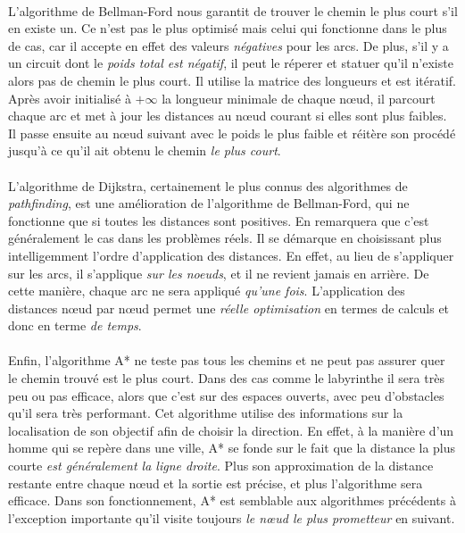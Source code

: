 \paragraph{} L'algorithme de Bellman-Ford nous garantit de trouver le chemin le plus court s'il en existe un. Ce n'est pas
le plus optimisé mais celui qui fonctionne dans le plus de cas, car il accepte en effet des valeurs \emph{négatives} pour les
arcs. De plus, s'il y a un circuit dont le \emph{poids total est négatif}, il peut le réperer et statuer qu'il n'existe alors
pas de chemin le plus court. Il utilise la matrice des longueurs et est itératif. Après avoir initialisé à $+\infty$ la 
longueur minimale de chaque n\oe{}ud, il parcourt chaque arc et met à jour les distances au n\oe{}ud courant si elles sont
plus faibles. Il passe ensuite au n\oe{}ud suivant avec le poids le plus faible et réitère son procédé jusqu'à ce qu'il ait
obtenu le chemin \emph{le plus court}.

\paragraph{} L'algorithme de Dijkstra, certainement le plus connus des algorithmes de \emph{pathfinding}, est une amélioration
de l'algorithme de Bellman-Ford, qui ne fonctionne que si toutes les distances sont positives. En remarquera que c'est généralement
le cas dans les problèmes réels. Il se démarque en choisissant plus intelligemment l'ordre d'application des distances. En effet,
au lieu de s'appliquer sur les arcs, il s'applique \emph{sur les noeuds}, et il ne revient jamais en arrière. De cette manière,
chaque arc ne sera appliqué \emph{qu'une fois}. L'application des distances n\oe{}ud par n\oe{}ud permet une \emph{réelle
optimisation} en termes de calculs et donc en terme \emph{de temps}.

\paragraph{} Enfin, l'algorithme A* ne teste pas tous les chemins et ne peut pas assurer quer le chemin trouvé est le
plus court. Dans des cas comme le labyrinthe il sera très peu ou pas efficace, alors que c'est sur des espaces ouverts,
avec peu d'obstacles qu'il sera très performant. Cet algorithme utilise des informations sur la localisation de son
objectif afin de choisir la direction. En effet, à la manière d'un homme qui se repère dans une ville, A* se fonde sur le
fait que la distance la plus courte \emph{est généralement la ligne droite}. Plus son approximation de la distance 
restante entre chaque n\oe{}ud et la sortie est précise, et plus l'algorithme sera efficace. Dans son fonctionnement, A*
est semblable aux algorithmes précédents à l'exception importante qu'il visite toujours \emph{le n\oe{}ud le plus
prometteur} en suivant.

